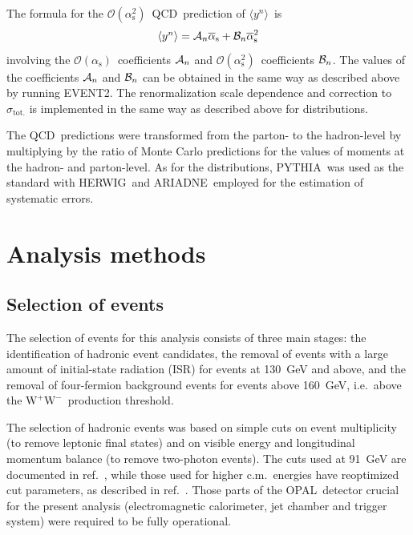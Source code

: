 \documentclass[12pt,a4paper,twoside]{article}
\newcommand{\sigtot}     {\ensuremath{\sigma_{\mathrm{tot.}}}}
\newcommand{\asb}    {\ensuremath{\overline{\alpha}_{\mathrm{s}}}}
\newcommand{\asbsq}    {\ensuremath{\overline{\alpha}_{\mathrm{s}}}^2}
\newcommand{\oa}     {\ensuremath{\mathcal{O}(\alpha_{\mathrm{s}})}}
\newcommand{\oaa}    {\ensuremath{\mathcal{O}(\alpha_{\mathrm{s}}^2)}}
\newcommand{\momn}[2] {\mbox{\ensuremath{\langle#1^{#2}\rangle}}}
\newcommand{\ww}     {\ensuremath{\mathrm{W^+W^-}}}
\newcommand{\Opal}{\mbox{\rm OPAL}}
\newcommand{\isr}{\mbox{ISR}}
\newcommand{\qcd}{\mbox{QCD}}
\newcommand{\Herwig}{\mbox{HERWIG}}
\newcommand{\Pythia}{\mbox{PYTHIA}}
\newcommand{\Event}{\mbox{EVENT}}
\newcommand{\Ariadne}{\mbox{ARIADNE}}
\begin{document}
The formula for the \oaa\ \qcd\ prediction of \momn{y}{n}\ is
\begin{equation}
  \momn{y}{n} = {\cal A}_n \asb + {\cal B}_n \asbsq
\label{eq_qcdmom}
\end{equation}
involving 
the \oa\ coefficients ${\cal A}_n$ and \oaa\ coefficients ${\cal
B}_n$.  The values of the coefficients ${\cal A}_n$ and ${\cal B}_n$
can be obtained in the same way as described above by running \Event2.
The renormalization scale dependence and correction to 
$\sigtot$
is implemented in the same way as described above for
distributions.

The \qcd\ predictions were transformed from the parton- to the hadron-level
by multiplying by the ratio of Monte Carlo predictions for the values
of moments at the hadron- and parton-level.  
As for the distributions, \Pythia\ was used as the standard with
\Herwig\ and \Ariadne\ employed for the estimation of systematic errors.  

\section{ Analysis methods }
\label{sec_anal}
\subsection{ Selection of events }
\label{sec_selec}

The selection of events for this analysis consists of 
three main stages: the identification of hadronic event candidates, 
the removal of events with a large amount of initial-state radiation 
(\isr) for events at 130~GeV and above, 
and the removal of four-fermion background events
for events above 160~GeV, i.e.\ above the \ww\ production threshold.

The selection of hadronic events was based on simple cuts on
event multiplicity (to remove leptonic final states) and on
visible energy and longitudinal momentum balance (to remove 
two-photon events).  The cuts used at 91~GeV are documented in
ref.~\cite{OPALPR035}, while those used for higher c.m.\ energies
have reoptimized cut parameters, as described in
ref.~\cite{OPALPR388}.  Those parts of the \Opal\ detector
crucial for the present analysis
(electromagnetic calorimeter, jet chamber and trigger system)
were required to be fully operational.
\end{document}
